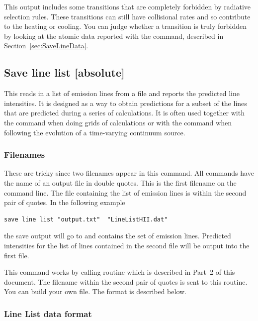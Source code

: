 This output includes some transitions that are completely forbidden by
radiative selection rules.  These transitions can still have collisional
rates and so contribute to the heating or cooling.  You can judge
whether a transition is truly forbidden by looking at the atomic data
reported with the  command, described in
Section~\ref{sec:SaveLineData}.

\subsection{Save line list [absolute]}

This reads in a list of emission lines from a file and reports the
predicted line intensities.  It is designed as a way to obtain predictions
for a subset of the lines that are predicted during a series of calculations.
It is often used together with the  command
when doing grids of calculations or with the  command
when following the evolution of a time-varying
continuum source.

\subsubsection{Filenames}  
These are tricky since two filenames appear in this command.
All  commands have the name of an output file
in double quotes.
This is the first filename on the command line.
The file containing the list
of emission lines is within the second pair of quotes.  In the following
example
\begin{verbatim}
save line list "output.txt"  "LineListHII.dat"
\end{verbatim}
the save output will go to 
and  contains the
set of emission lines.
Predicted intensities for the list of lines contained
in the second file will be output into the first file.
 
This command works by calling routine 
which is described in Part~2 of this document.
The filename within the second pair of quotes
is sent to this routine.
You can build your own file. The format is described below.

\subsubsection{Line List data format}
\label{sec:LineListDataFormat}

